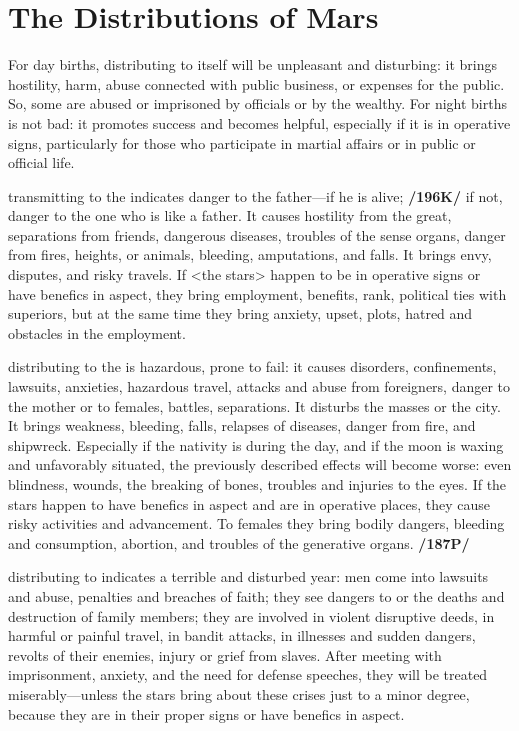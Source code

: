 \section{The Distributions of Mars}

For day births, \Mars\xspace distributing to itself will be unpleasant and disturbing: it brings hostility, harm, abuse connected with public business, or expenses for the public. So, some are abused or imprisoned by officials or by the wealthy. For night births \Mars\xspace is not bad: it promotes success and becomes helpful, especially if it is in operative signs, particularly for those who participate in martial affairs or in public or official life.

\Mars\xspace transmitting to the \Sun\xspace indicates danger to the father—if he is alive; \textbf{/196K/} if not, danger to the one who is like a father. It causes hostility from the great, separations from friends, dangerous diseases, troubles of the sense organs, danger from fires, heights, or animals, bleeding, amputations, and falls. It brings envy, disputes, and risky travels. If <the stars> happen to be in operative signs or have benefics in aspect, they bring employment, benefits, rank, political ties with superiors, but at the same time they bring anxiety, upset, plots, hatred and obstacles in the employment.

\Mars\xspace distributing to the \Moon\xspace is hazardous, prone to fail: it causes disorders, confinements, lawsuits,
anxieties, hazardous travel, attacks and abuse from foreigners, danger to the mother or to females, battles, separations. It disturbs the masses or the city. It brings weakness, bleeding, falls, relapses of diseases, danger from fire, and shipwreck. Especially if the nativity is during the day, and if the moon is waxing and unfavorably situated, the previously described effects will become worse: even blindness, wounds, the
breaking of bones, troubles and injuries to the eyes. If the stars happen to have benefics in aspect and are in operative places, they cause risky activities and advancement. To females they bring bodily dangers, bleeding and consumption, abortion, and troubles of the generative organs. \textbf{/187P/}

\Mars\xspace distributing to \Saturn\xspace indicates a terrible and disturbed year: men come into lawsuits and
abuse, penalties and breaches of faith; they see dangers to or the deaths and destruction of family members; they are involved in violent disruptive deeds, in harmful or painful travel, in bandit attacks, in illnesses and sudden dangers, revolts of their enemies, injury or grief from slaves. After meeting with imprisonment, anxiety, and the need for defense speeches, they will be treated miserably—unless the stars bring about these crises just to a minor degree, because they are in their proper signs or have benefics in aspect.

